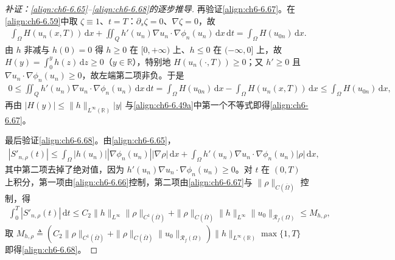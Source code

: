 \documentclass[../../main.tex]{subfiles}%
\begin{document}
\begin{proof}[补证：\eqref{align:ch6-6.65}--\eqref{align:ch6-6.68}的逐步推导]
再验证\eqref{align:ch6-6.67}。在\eqref{align:ch6-6.59}中取 $\zeta\equiv1$、$t=T$：$\partial_s\zeta=0$、$\nabla\zeta=0$，故
\begin{align*}
\int_\Omega H(u_n(x,T))\,\mathrm{d}x+\iint_Qh'(u_n)\nabla u_n\cdot\nabla\phi_n(u_n)\,\mathrm{d}x\,\mathrm{d}t=\int_\Omega H(u_{0n})\,\mathrm{d}x.
\end{align*}
由 $h$ 非减与 $h(0)=0$ 得 $h\geqslant0$ 在 $[0,+\infty)$ 上、$h\leqslant0$ 在 $(-\infty,0]$ 上，故 $H(y)=\int_0^yh(z)\,\mathrm{d}z\geqslant0$（$y\in\mathbb{R}$），特别地 $H(u_n(\cdot,T))\geqslant0$；又 $h'\geqslant0$ 且 $\nabla u_n\cdot\nabla\phi_n(u_n)\geqslant0$，故左端第二项非负。于是
\begin{align*}
0\leqslant\iint_Qh'(u_n)\nabla u_n\cdot\nabla\phi_n(u_n)\,\mathrm{d}x\,\mathrm{d}t
=\int_\Omega H(u_{0n})\,\mathrm{d}x-\int_\Omega H(u_n(x,T))\,\mathrm{d}x
\leqslant\int_\Omega H(u_{0n})\,\mathrm{d}x,
\end{align*}
再由 $|H(y)|\leqslant\|h\|_{L^\infty(\mathbb{R})}|y|$ 与\eqref{align:ch6-6.49a}中第一个不等式即得\eqref{align:ch6-6.67}。

最后验证\eqref{align:ch6-6.68}。由\eqref{align:ch6-6.65}，
\begin{align*}
|S'_{n,\rho}(t)|\leqslant\int_\Omega|h(u_n)||\nabla\phi_n(u_n)||\nabla\rho|\,\mathrm{d}x
+\int_\Omega h'(u_n)\nabla u_n\cdot\nabla\phi_n(u_n)|\rho|\,\mathrm{d}x,
\end{align*}
其中第二项去掉了绝对值，因为 $h'(u_n)\nabla u_n\cdot\nabla\phi_n(u_n)\geqslant0$。对 $t$ 在 $(0,T)$ 上积分，第一项由\eqref{align:ch6-6.66}控制，第二项由\eqref{align:ch6-6.67}与 $\|\rho\|_{C(\overline\Omega)}$ 控制，得
\begin{align*}
\int_0^T|S'_{n,\rho}(t)|\,\mathrm{d}t
\leqslant C_2\|h\|_{L^\infty}\|\rho\|_{C^1(\overline\Omega)}
+\|\rho\|_{C(\overline\Omega)}\|h\|_{L^\infty}\|u_0\|_{\mathscr{R}_f(\Omega)}
\leqslant M_{h,\rho},
\end{align*}
取 $M_{h,\rho}\triangleq(C_2\|\rho\|_{C^1(\overline\Omega)}+\|\rho\|_{C(\overline\Omega)}\|u_0\|_{\mathscr{R}_f(\Omega)})\|h\|_{L^\infty(\mathbb{R})}\max\{1,T\}$ 即得\eqref{align:ch6-6.68}。
\end{proof}
\end{document}

